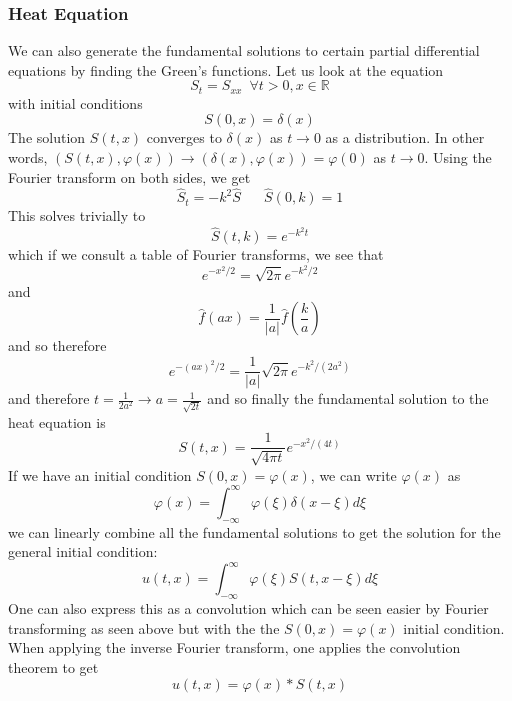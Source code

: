 \documentclass{article}
\newcommand{\R}{\mathbb{R}}
\newcommand{\twen}{\hspace{20pt}}
\newcommand{\push}{\,\,\,}
\theoremstyle{definition}
\begin{document}
\subsubsection{Heat Equation}
We can also generate the fundamental solutions to certain partial differential equations by finding the Green's functions. Let us look at the equation 
\begin{equation*}
    S_t = S_{xx} \push \forall t>0, x\in \R
\end{equation*}
with initial conditions 
\begin{equation*}
    S(0,x) = \delta (x)
\end{equation*}
The solution $S(t,x)$ converges to $\delta (x)$ as $t \to 0$ as a distribution. In other words, $(S(t,x),\varphi(x)) \to (\delta (x) , \varphi(x)) = \varphi(0)$ as $t\to 0$. Using the Fourier transform on both sides, we get 
\begin{equation*}
    \hat S_t = -k^2 \hat S \twen \hat S(0,k) = 1
\end{equation*}
This solves trivially to 
\begin{equation*}
    \hat S(t,k) = e^{-k^2 t}
\end{equation*}
which if we consult a table of Fourier transforms, we see that 
\begin{equation*}
    e^{-x^2/2} = \sqrt{2\pi} e^{-k^2/2}
\end{equation*}
and 
\begin{equation*}
    \hat f(ax) = \frac{1}{|a|} \hat f\left(\frac{k}{a}\right)
\end{equation*}
and so therefore 
\begin{equation*}
    e^{-(ax)^2/2} = \frac{1}{|a|} \sqrt{2\pi} e^{-k^2/(2a^2)} 
\end{equation*}
and therefore $t=\frac{1}{2a^2}\to a=\frac{1}{\sqrt{2t}}$ and so finally the fundamental solution to the heat equation is 
\begin{equation*}
    S(t,x) = \frac{1}{\sqrt{4\pi t}} e^{-x^2/(4t)}
\end{equation*}
If we have an initial condition $S(0,x) = \varphi(x)$, we can write $\varphi(x)$ as 
\begin{equation*}
    \varphi(x) = \int^\infty_{-\infty} \varphi(\xi) \delta(x-\xi) d\xi
\end{equation*}
we can linearly combine all the fundamental solutions to get the solution for the general initial condition:
\begin{equation*}
    u(t,x) = \int^\infty_{-\infty} \varphi(\xi) S(t,x-\xi) d\xi
\end{equation*}
One can also express this as a convolution which can be seen easier by Fourier transforming as seen above but with the the $S(0,x)= \varphi(x)$ initial condition. When applying the inverse Fourier transform, one applies the convolution theorem to get 
\begin{equation*}
    u(t,x) = \varphi(x) * S(t,x)
\end{equation*}
\end{document}
